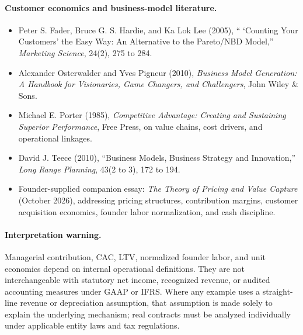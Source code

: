 \paragraph{Customer economics and business-model literature.}
\begin{itemize}
  \item Peter S. Fader, Bruce G. S. Hardie, and Ka Lok Lee (2005), `` `Counting Your Customers' the Easy Way: An Alternative to the Pareto/NBD Model,'' \emph{Marketing Science}, 24(2), 275 to 284.
  \item Alexander Osterwalder and Yves Pigneur (2010), \emph{Business Model Generation: A Handbook for Visionaries, Game Changers, and Challengers}, John Wiley \& Sons.
  \item Michael E. Porter (1985), \emph{Competitive Advantage: Creating and Sustaining Superior Performance}, Free Press, on value chains, cost drivers, and operational linkages.
  \item David J. Teece (2010), ``Business Models, Business Strategy and Innovation,'' \emph{Long Range Planning}, 43(2 to 3), 172 to 194.
  \item Founder-supplied companion essay: \emph{The Theory of Pricing and Value Capture} (October 2026), addressing pricing structures, contribution margins, customer acquisition economics, founder labor normalization, and cash discipline.
\end{itemize}

\paragraph{Interpretation warning.}
Managerial contribution, CAC, LTV, normalized founder labor, and unit economics depend on internal operational definitions. They are not interchangeable with statutory net income, recognized revenue, or audited accounting measures under GAAP or IFRS. Where any example uses a straight-line revenue or depreciation assumption, that assumption is made solely to explain the underlying mechanism; real contracts must be analyzed individually under applicable entity laws and tax regulations.
